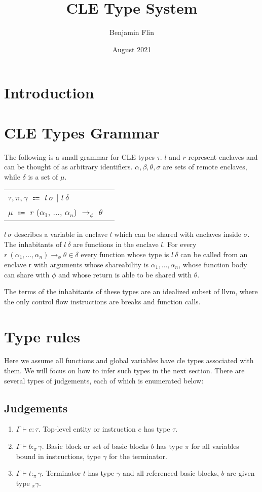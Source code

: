 \documentclass{article}
\title{CLE Type System}
\author{Benjamin Flin}
\date{August 2021}
\begin{document}
\maketitle

\section{Introduction}
\section{CLE Types Grammar}
The following is a small grammar for CLE types $\tau$. 
$l$ and $r$ represent enclaves and can be thought of as arbitrary identifiers.
$\alpha, \beta, \theta, \sigma$ are sets of remote enclaves, while $\delta$ is a set of $\mu$.
\begin{center}
\begin{tabular}{ l r }
    $\tau, \pi, \gamma$ $\Coloneqq$ $l\ \sigma$ $\bigl\vert$ $l\ \delta$ \\
    $\mu$ $\Coloneqq$ $r$ ($\alpha_1$, $\dots$, $\alpha_n$) $\rightarrow_\phi$ $\theta$ \\
\end{tabular}
\end{center}


$l\ \sigma$ describes a variable in enclave $l$ which can be shared with enclaves inside $\sigma$. 
The inhabitants of $l\ \delta$ are functions in the enclave $l$. For every $r\ (\alpha_1, \dots, \alpha_n) \rightarrow_\phi \theta \in \delta$
every function whose type is $l\ \delta$ can be called from an enclave r with
arguments whose shareability is $\alpha_1, \dots, \alpha_n$, whose function body can share with $\phi$ and whose
return is able to be shared with $\theta$.

The terms of the inhabitants of these types are an idealized subset of llvm, where the only control flow instructions
are breaks and function calls. 

\section{Type rules}
Here we assume all functions and global variables have cle types associated with them.  We will focus on how to infer such types in the next section.
There are several types of judgements, each of which is enumerated below:

\subsection{Judgements}
\begin{enumerate}
    \item $\Gamma \vdash e : \tau$. 
    Top-level entity or instruction $e$ has type $\tau$. 
    \item $\Gamma \vdash b :_\pi \gamma$. 
    Basic block or set of basic blocks $b$ has type $\pi$ for all variables bound in instructions, type $\gamma$ for the terminator.
    \item $\Gamma \vdash t :_\pi \gamma$. 
    Terminator $t$ has type $\gamma$ and all referenced basic blocks, $b$ are given type $_\pi \gamma$.
\end{enumerate}
\end{document}
